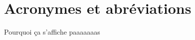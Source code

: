 \section*{Acronymes et abréviations}

\printglossary[type=\acronymtype, nonumberlist]

Pourquoi ça s'affiche paaaaaaas